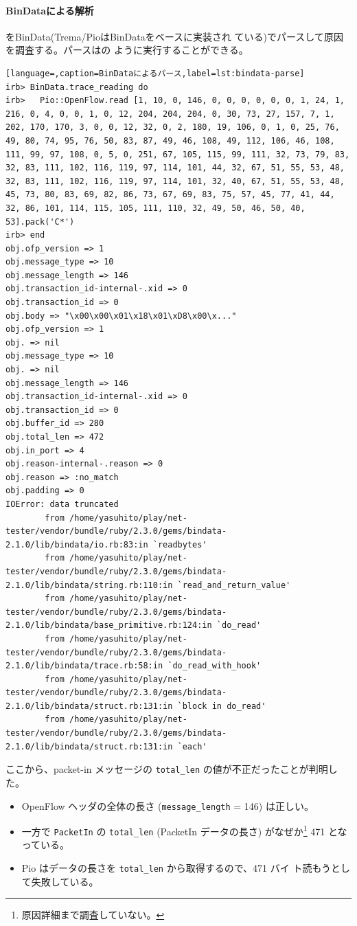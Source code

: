     \paragraph{BinDataによる解析}
をBinData(Trema/PioはBinDataをベースに実装され
ている)でパースして原因を調査する。パースはの
ように実行することができる。

\begin{lstlisting}[language=,caption=BinDataによるパース,label=lst:bindata-parse]
irb> BinData.trace_reading do
irb>   Pio::OpenFlow.read [1, 10, 0, 146, 0, 0, 0, 0, 0, 0, 1, 24, 1, 216, 0, 4, 0, 0, 1, 0, 12, 204, 204, 204, 0, 30, 73, 27, 157, 7, 1, 202, 170, 170, 3, 0, 0, 12, 32, 0, 2, 180, 19, 106, 0, 1, 0, 25, 76, 49, 80, 74, 95, 76, 50, 83, 87, 49, 46, 108, 49, 112, 106, 46, 108, 111, 99, 97, 108, 0, 5, 0, 251, 67, 105, 115, 99, 111, 32, 73, 79, 83, 32, 83, 111, 102, 116, 119, 97, 114, 101, 44, 32, 67, 51, 55, 53, 48, 32, 83, 111, 102, 116, 119, 97, 114, 101, 32, 40, 67, 51, 55, 53, 48, 45, 73, 80, 83, 69, 82, 86, 73, 67, 69, 83, 75, 57, 45, 77, 41, 44, 32, 86, 101, 114, 115, 105, 111, 110, 32, 49, 50, 46, 50, 40, 53].pack('C*')
irb> end
obj.ofp_version => 1
obj.message_type => 10
obj.message_length => 146
obj.transaction_id-internal-.xid => 0
obj.transaction_id => 0
obj.body => "\x00\x00\x01\x18\x01\xD8\x00\x..."
obj.ofp_version => 1
obj. => nil
obj.message_type => 10
obj. => nil
obj.message_length => 146
obj.transaction_id-internal-.xid => 0
obj.transaction_id => 0
obj.buffer_id => 280
obj.total_len => 472
obj.in_port => 4
obj.reason-internal-.reason => 0
obj.reason => :no_match
obj.padding => 0
IOError: data truncated
        from /home/yasuhito/play/net-tester/vendor/bundle/ruby/2.3.0/gems/bindata-2.1.0/lib/bindata/io.rb:83:in `readbytes'
        from /home/yasuhito/play/net-tester/vendor/bundle/ruby/2.3.0/gems/bindata-2.1.0/lib/bindata/string.rb:110:in `read_and_return_value'
        from /home/yasuhito/play/net-tester/vendor/bundle/ruby/2.3.0/gems/bindata-2.1.0/lib/bindata/base_primitive.rb:124:in `do_read'
        from /home/yasuhito/play/net-tester/vendor/bundle/ruby/2.3.0/gems/bindata-2.1.0/lib/bindata/trace.rb:58:in `do_read_with_hook'
        from /home/yasuhito/play/net-tester/vendor/bundle/ruby/2.3.0/gems/bindata-2.1.0/lib/bindata/struct.rb:131:in `block in do_read'
        from /home/yasuhito/play/net-tester/vendor/bundle/ruby/2.3.0/gems/bindata-2.1.0/lib/bindata/struct.rb:131:in `each'
\end{lstlisting}

ここから、packet-in メッセージの \verb|total_len| の値が不正だったことが判明した。
\begin{itemize}
 \item OpenFlow ヘッダの全体の長さ (\verb|message_length| = 146) は正しい。
 \item 一方で \verb|PacketIn| の \verb|total_len| (PacketIn データの長さ)
       がなぜか\footnote{原因詳細まで調査していない。} 471 となっている。
 \item Pio はデータの長さを \verb|total_len| から取得するので、471 バイ
       ト読もうとして失敗している。
\end{itemize}

